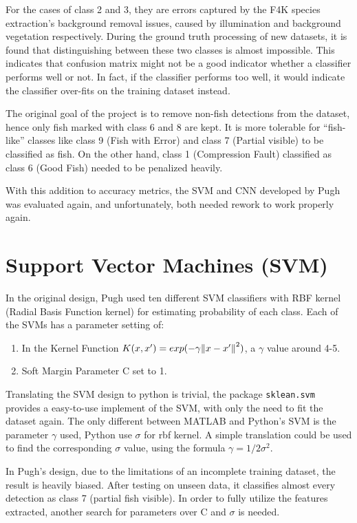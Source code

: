 \documentclass[bsc,logo,twoside,fullspacing,parskip]{infthesis}
\begin{document}
For the cases of class 2 and 3, they are errors captured by the F4K species extraction's background removal issues, caused by illumination and background vegetation respectively.
During the ground truth processing of new datasets, it is found that distinguishing between these two classes is almost impossible.
This indicates that confusion matrix might not be a good indicator whether a classifier performs well or not. In fact, if the classifier performs too well, it would indicate the classifier over-fits on the training dataset instead.

The original goal of the project is to remove non-fish detections from the dataset, hence only fish marked with class 6 and 8 are kept. 
It is more tolerable for ``fish-like'' classes like class 9 (Fish with Error) and class 7 (Partial visible) to be classified as fish.
On the other hand, class 1 (Compression Fault) classified as class 6 (Good Fish) needed to be penalized heavily. 

With this addition to accuracy metrics, the SVM and CNN developed by Pugh was evaluated again, and unfortunately, both needed rework to work properly again.

\section{Support Vector Machines (SVM)}

In the original design, Pugh used ten different SVM classifiers with RBF kernel (Radial Basis Function kernel) for estimating probability of each class. Each of the SVMs has a parameter setting of:
\renewcommand{\labelenumi}{\bfseries\arabic{enumi}}
\begin{enumerate}
\setlength{\parskip}{1pt}
	\item In the Kernel Function \(K(x,x') = exp(-\gamma\norm{x-x'}^2)\), a \(\gamma\) value around 4-5.
	\item Soft Margin Parameter C set to 1.
\end{enumerate}
Translating the SVM design to python is trivial, the package {\tt sklean.svm} provides a easy-to-use implement of the SVM, with only the need to fit the dataset again.
The only different between MATLAB and Python's SVM is the parameter \(\gamma\) used, Python use \(\sigma\) for rbf kernel. A simple translation could be used to find the corresponding \(\sigma\) value, using the formula \( \gamma = 1/2\sigma^2 \).

In Pugh's design, due to the limitations of an incomplete training dataset, the result is heavily biased. After testing on unseen data, it classifies almost every detection as class 7 (partial fish visible). In order to fully utilize the features extracted, another search for parameters over C and \(\sigma\) is needed.
\end{document}
